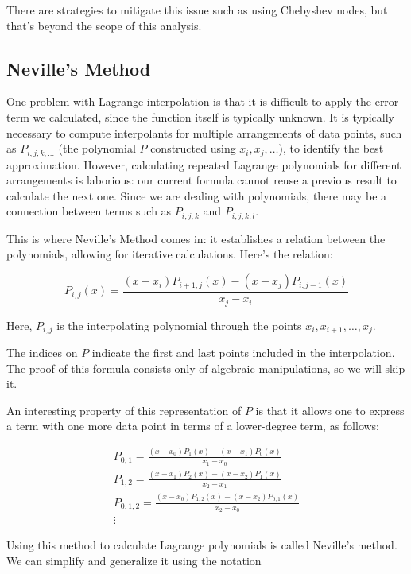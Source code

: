 \documentclass[12pt]{article}
\theoremstyle{plain}
\theoremstyle{remark}
\begin{document}
There are strategies to mitigate this issue such as using Chebyshev nodes, but that's beyond the scope of this analysis.

\subsection{Neville's Method}

One problem with Lagrange interpolation is that it is difficult to apply the error term we calculated, since the function itself is typically unknown. It is typically necessary to compute interpolants for multiple arrangements of data points, such as $P_{i, j, k, \dots}$ (the polynomial $P$ constructed using $x_i, x_j, \dots$), to identify the best approximation. However, calculating repeated Lagrange polynomials for different arrangements is laborious: our current formula cannot reuse a previous result to calculate the next one. Since we are dealing with polynomials, there may be a connection between terms such as $P_{i, j, k}$ and $P_{i, j, k, l}$.

This is where Neville's Method comes in: it establishes a relation between the polynomials, allowing for iterative calculations. Here's the relation:

\[
  P_{i,j}(x) = \frac{(x - x_i)P_{i+1,j}(x) - (x - x_j)P_{i,j-1}(x)}{x_j - x_i}
\]

Here, $P_{i,j}$ is the interpolating polynomial through the points $x_i, x_{i+1}, \dots, x_j$.

The indices on $P$ indicate the first and last points included in the interpolation. The proof of this formula consists only of algebraic manipulations, so we will skip it.

An interesting property of this representation of $P$ is that it allows one to express a term with one more data point in terms of a lower-degree term, as follows:

\begin{gather*}
  P_{0, 1} = \frac{(x - x_0)P_{1}(x) - (x - x_1)P_{0}(x)}{x_1 - x_0} \\
  P_{1, 2} = \frac{(x - x_1)P_{2}(x) - (x - x_2)P_{1}(x)}{x_2 - x_1} \\
  P_{0, 1, 2} = \frac{(x - x_0)P_{1, 2}(x) - (x - x_2)P_{0, 1}(x)}{x_2 - x_0} \\
  \vdots
\end{gather*}

Using this method to calculate Lagrange polynomials is called Neville's method. We can simplify and generalize it using the notation
\end{document}
